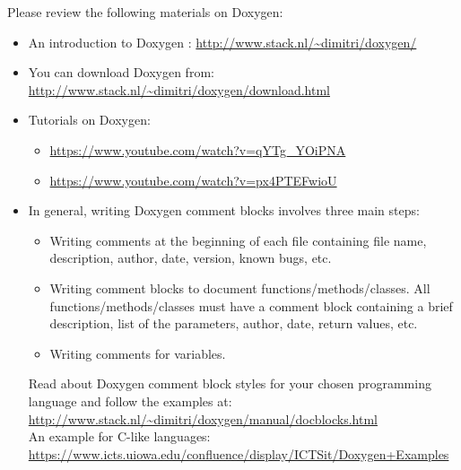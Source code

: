 \documentclass[12pt,fleqn]{article}
\newcommand{\bi}{\begin{itemize}}
\newcommand{\ei}{\end{itemize}}
\begin{document}




Please review the following materials on Doxygen:
\bi
\item An introduction to Doxygen : \url{http://www.stack.nl/~dimitri/doxygen/}
\item You can download Doxygen from:
\\
 \url{http://www.stack.nl/~dimitri/doxygen/download.html}
\item Tutorials on Doxygen: 
	\bi
	\item \url{https://www.youtube.com/watch?v=qYTg_YOiPNA}
	\item \url{https://www.youtube.com/watch?v=px4PTEFwioU}
	\ei

\item In general, writing Doxygen comment blocks involves three main steps:
	\bi
\item Writing comments at the beginning of each file containing file name,
description, author, date, version, known bugs, etc.
\item Writing comment blocks to document functions/methods/classes. All functions/methods/classes must
have a comment block containing a brief description, list of the parameters,
author, date, return values, etc.
\item Writing comments for variables.
	\ei
	
Read about Doxygen comment block styles for your chosen programming language
and follow the examples at:
\\
 \url{http://www.stack.nl/~dimitri/doxygen/manual/docblocks.html}
\\
 An example for C-like languages:
\\
\url{https://www.icts.uiowa.edu/confluence/display/ICTSit/Doxygen+Examples}
\\
\ei
 
\end{document}

